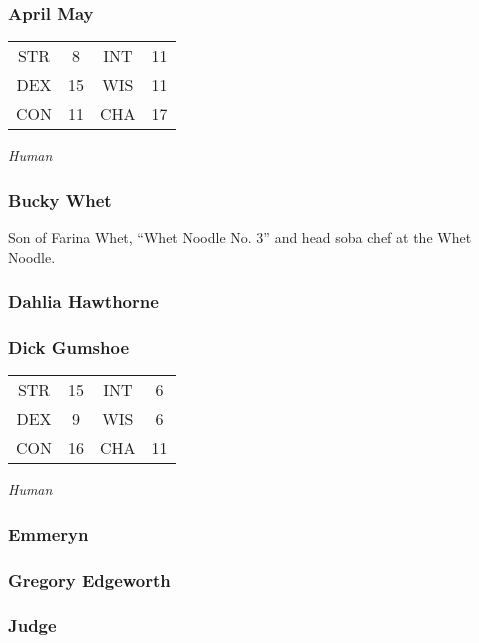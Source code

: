 \subsubsection{April May}
\label{people:aprilmay}
\begin{center}
\begin{tabular}{c c|c c}
STR & 8 & INT & 11\\
DEX & 15 & WIS & 11 \\
CON & 11 & CHA & 17 \end{tabular}\end{center}
\textit{Human}\\

\subsubsection{Bucky Whet}
\label{people:bucky}
Son of Farina Whet, ``Whet Noodle No. 3'' and head soba chef at the Whet Noodle. 


\subsubsection{Dahlia Hawthorne}
\label{people:dahlia}

\subsubsection{Dick Gumshoe}
\label{people:gumshoe}
\begin{center}
\begin{tabular}{c c|c c}
STR & 15 & INT & 6\\
DEX & 9 & WIS & 6 \\
CON & 16 & CHA & 11 \end{tabular}\end{center}
\textit{Human}\\

\subsubsection{Emmeryn}
\label{people:emmeryn}

\subsubsection{Gregory Edgeworth}
\label{people:gregory}

\subsubsection{Judge}
\label{people:judge}


